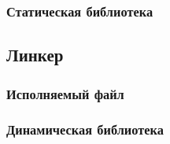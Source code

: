     \subsubsection{Статическая библиотека}
    \subsection{Линкер}
    \subsubsection{Исполняемый файл}
    \subsubsection{Динамическая библиотека}




